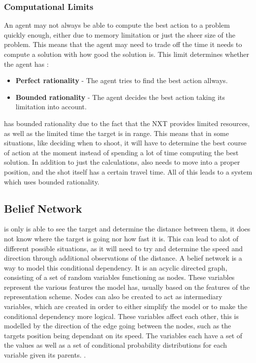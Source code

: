 \subsubsection{Computational Limits}
An agent may not always be able to compute the best action to a problem quickly
enough, either due to memory limitation or just the sheer size of the problem.
This means that the agent may need to trade off the time it needs to compute a
solution with how good the solution is. This limit determines whether the agent
has \citep[ch.1.5.8]{MIBook}:

\begin{itemize}
  \item \textbf{Perfect rationality} - The agent tries to find the best action
  allways.
  \item \textbf{Bounded rationality} - The agent decides the best action taking
  its limitation into account.
\end{itemize}

\name has bounded rationality due to the fact that the NXT provides limited
resources, as well as the limited time the target is in range. This means that
in some situations, like deciding when to shoot, it will have to determine the
best course of action at the moment instead of spending a lot of time computing
the best solution. In addition to just the calculations, \name also needs to
move into a proper position, and the shot itself has a certain travel time. All
of this leads to a system which uses bounded rationality.

\subsection{Belief Network}\label{LabelBN}
\name is only is able to see the
target and determine the distance between them, it does not know where the
target is going nor how fast it is. This can lead to alot of different possible
situations, as it will need to try and determine the speed and direction through
additional observations of the distance. A belief network is a way to model
this conditional dependency. It is an acyclic directed graph, consisting of a
set of random variables functioning as nodes. These variables represent the
various features the model has, usually based on the features of
the representation scheme. Nodes can also be created to act as
intermediary variables, which are created in order to either simplify the model
or to make the conditional dependency more logical. These variables affect each
other, this is modelled by the direction of the edge going between the nodes,
such as the targets position being dependant on its speed. The variables each
have a set of the values as well as a set of conditional probability
distributions for each variable given its parents. \citep[ch.6.3]{MIBook}.

